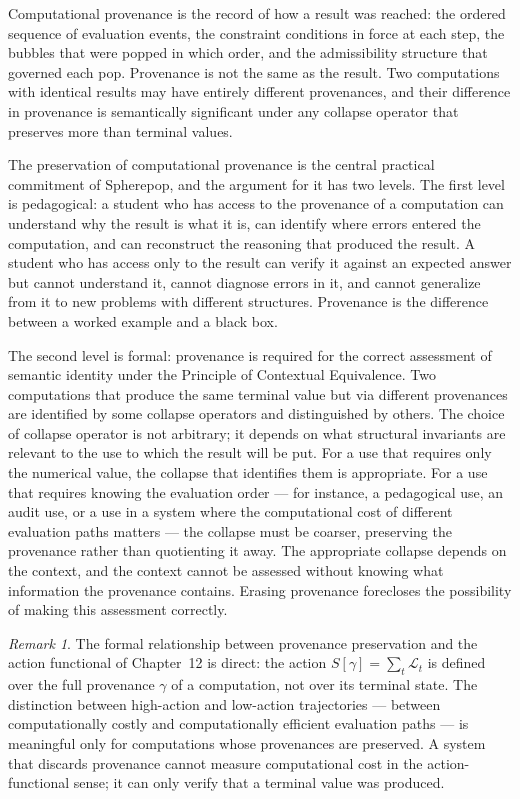 \documentclass[12pt,openany]{book}
\theoremstyle{plain}
\theoremstyle{definition}
\theoremstyle{remark}
\newtheorem{remark}[theorem]{Remark}
\begin{document}
Computational provenance is the record of how a result was reached: the ordered sequence of evaluation events, the constraint conditions in force at each step, the bubbles that were popped in which order, and the admissibility structure that governed each pop. Provenance is not the same as the result. Two computations with identical results may have entirely different provenances, and their difference in provenance is semantically significant under any collapse operator that preserves more than terminal values.

The preservation of computational provenance is the central practical commitment of Spherepop, and the argument for it has two levels. The first level is pedagogical: a student who has access to the provenance of a computation can understand why the result is what it is, can identify where errors entered the computation, and can reconstruct the reasoning that produced the result. A student who has access only to the result can verify it against an expected answer but cannot understand it, cannot diagnose errors in it, and cannot generalize from it to new problems with different structures. Provenance is the difference between a worked example and a black box.

The second level is formal: provenance is required for the correct assessment of semantic identity under the Principle of Contextual Equivalence. Two computations that produce the same terminal value but via different provenances are identified by some collapse operators and distinguished by others. The choice of collapse operator is not arbitrary; it depends on what structural invariants are relevant to the use to which the result will be put. For a use that requires only the numerical value, the collapse that identifies them is appropriate. For a use that requires knowing the evaluation order — for instance, a pedagogical use, an audit use, or a use in a system where the computational cost of different evaluation paths matters — the collapse must be coarser, preserving the provenance rather than quotienting it away. The appropriate collapse depends on the context, and the context cannot be assessed without knowing what information the provenance contains. Erasing provenance forecloses the possibility of making this assessment correctly.

\begin{remark}
The formal relationship between provenance preservation and the action functional of Chapter~12 is direct: the action $S[\gamma] = \sum_t \mathcal{L}_t$ is defined over the full provenance $\gamma$ of a computation, not over its terminal state. The distinction between high-action and low-action trajectories — between computationally costly and computationally efficient evaluation paths — is meaningful only for computations whose provenances are preserved. A system that discards provenance cannot measure computational cost in the action-functional sense; it can only verify that a terminal value was produced.
\end{remark}
\end{document}
